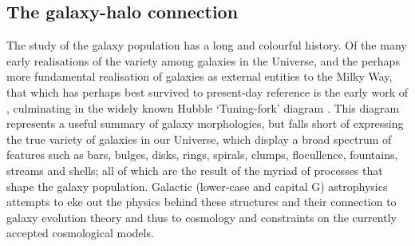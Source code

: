 \subsection{The galaxy-halo connection}
\label{sec:galaxyhaloconnect}
The study of the galaxy population has a long and colourful history. Of the many early realisations of the variety among galaxies in the Universe, and the perhaps more fundamental realisation of galaxies as external entities to the Milky Way, that which has perhaps best survived to present-day reference is the early work of \citet{1926ApJ....64..321H}, culminating in the widely known Hubble `Tuning-fork' diagram \citep[e.g.][]{1936rene.book.....H,1961hag..book.....S}. This diagram represents a useful summary of galaxy morphologies, but falls short of expressing the true variety of galaxies in our Universe, which display a broad spectrum of features such as bars, bulges, disks, rings, spirals, clumps, flocullence, fountains, streams and shells; all of which are the result of the myriad of processes that shape the galaxy population. Galactic (lower-case and capital G) astrophysics attempts to eke out the physics behind these structures and their connection to galaxy evolution theory and thus to cosmology and constraints on the currently accepted cosmological models. 

